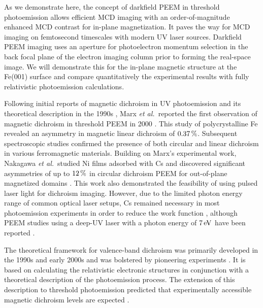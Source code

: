 \documentclass[prl,twocolumn,floatfix,superscriptaddress,aps]{revtex4-2}
\begin{document}
As we demonstrate here, the concept of darkfield PEEM in threshold photoemission allows efficient MCD imaging with an order-of-magnitude enhanced MCD contrast for in-plane magnetization. It paves the way for MCD imaging on femtosecond timescales with modern UV laser sources. Darkfield PEEM imaging uses an aperture for photoelectron momentum selection in the back focal plane of the electron imaging column prior to forming the real-space image. We will demonstrate this for the in-plane magnetic structure at the Fe(001) surface and compare quantitatively the experimental results with fully relativistic photoemission calculations.

Following initial reports of magnetic dichroism in UV photoemission and its theoretical description in the 1990s \cite{schneider1991,henk1996,feder1996}, Marx \textit{et al.}\ reported the first observation of magnetic dichroism in threshold PEEM in 2000 \cite{marx2000}. This study of polycrystalline Fe revealed an asymmetry in magnetic linear dichroism of $\unit[0.37]{\%}$. Subsequent spectroscopic studies confirmed the presence of both circular and linear dichroism in various ferromagnetic materials. Building on Marx's experimental work, Nakagawa \textit{et al.}\ studied Ni films adsorbed with Cs and discovered significant asymmetries of up to $\unit[12]{\%}$ in circular dichroism PEEM for out-of-plane magnetized domains \cite{nakagawa2006,nakagawa2007,nakagawa2009,nakagawa2012}. This work also demonstrated the feasibility of using pulsed laser light for dichroism imaging. However, due to the limited photon energy range of common optical laser setups, Cs remained necessary in most photoemission experiments in order to reduce the work function \cite{kronseder2011, meier2017}, although PEEM studies using a deep-UV laser with a photon energy of $\unit[7]{eV}$ have been reported \cite{zhao2019}. 

The theoretical framework for valence-band dichroism was primarily developed in the 1990s and early 2000s \cite{tamura1987, feder1996,henk1996,kuch1996a,feder1998,venus1994,venus1997,kuch2001} and was bolstered by pioneering experiments \cite{venus95, hild2008, hild2009, hild2010}. It is based on calculating the relativistic electronic  structures in conjunction with a theoretical description of the photoemission process. 
The extension of this description to threshold photoemission predicted that experimentally accessible magnetic dichroism levels are expected \cite{feder1998}. 
\end{document}
